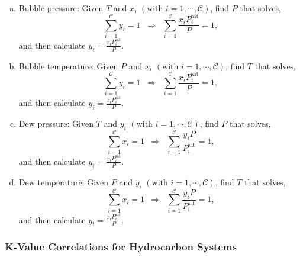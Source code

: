 \documentclass[12pts,a4paper,amsmath,amssymb,floatfix]{article}%
\newcommand{\frc}{\displaystyle\frac}
\newcommand{\summation}[3][error]{\sum\limits_{#2}^{#3}#1}
\begin{document}
\begin{enumerate}[a)]
    \item Bubble pressure: Given $T$ and $x_{i}$ $\left(\text{with }i=1,\cdots,\mathcal{C}\right)$, find $P$ that solves,
        \begin{displaymath}
           \summation[y_{i}]{i=1}{\mathcal{C}} = 1 \;\;\Longrightarrow\;\; \summation[\frc{x_{i}P_{i}^{\text{sat}}}{P}]{i=1}{\mathcal{C}} = 1,
        \end{displaymath}
        and then calculate $y_{i}= \frc{x_{i}P_{i}^{\text{sat}}}{P}$.
        
    \item Bubble temperature: Given $P$ and $x_{i}$ $\left(\text{with }i=1,\cdots,\mathcal{C}\right)$, find $T$ that solves,
        \begin{displaymath}
           \summation[y_{i}]{i=1}{\mathcal{C}} = 1 \;\;\Longrightarrow\;\; \summation[\frc{x_{i}P_{i}^{\text{sat}}}{P}]{i=1}{\mathcal{C}} = 1,
        \end{displaymath}
        and then calculate $y_{i}= \frc{x_{i}P_{i}^{\text{sat}}}{P}$.
      
    \item Dew pressure: Given $T$ and $y_{i}$ $\left(\text{with }i=1,\cdots,\mathcal{C}\right)$, find $P$ that solves,
        \begin{displaymath}
           \summation[x_{i}]{i=1}{\mathcal{C}} = 1 \;\;\Longrightarrow\;\; \summation[\frc{y_{i}P}{P_{i}^{\text{sat}}}]{i=1}{\mathcal{C}} = 1,
        \end{displaymath}
        and then calculate $y_{i}= \frc{x_{i}P_{i}^{\text{sat}}}{P}$.
      
    \item Dew temperature: Given $P$ and $y_{i}$ $\left(\text{with }i=1,\cdots,\mathcal{C}\right)$, find $T$ that solves,
        \begin{displaymath}
           \summation[x_{i}]{i=1}{\mathcal{C}} = 1 \;\;\Longrightarrow\;\; \summation[\frc{y_{i}P}{P_{i}^{\text{sat}}}]{i=1}{\mathcal{C}} = 1,
        \end{displaymath}
        and then calculate $y_{i}= \frc{x_{i}P_{i}^{\text{sat}}}{P}$.
\end{enumerate}


\subsubsection{K-Value Correlations for Hydrocarbon Systems}
\end{document}
